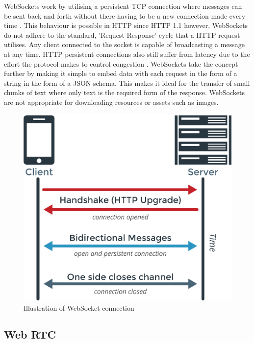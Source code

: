 WebSockets work by utilising a persistent TCP connection where messages can be sent back and forth without there having to be a new connection made every time \cite{wsrfc}. This behaviour is possible in HTTP since HTTP 1.1 however, WebSockets do not adhere to the standard, 'Request-Response' cycle that a HTTP request utilises. Any client connected to the socket is capable of broadcasting a message at any time. HTTP persistent connections also still suffer from latency due to the effort the protocol makes to control congestion \cite{httpvsws}. WebSockets take the concept further by making it simple to embed data with each request in the form of a string in the form of a JSON schema. This makes it ideal for the transfer of small chunks of text where only text is the required form of the response. WebSockets are not appropriate for downloading resources or assets such as images.

\begin{figure}[h!]
    \centering
    \includegraphics[scale=0.3]{res/WebSockets-Diagram.png}
    \caption{Illustration of WebSocket connection \cite{websocket-img}}
    \label{}
\end{figure}

\subsection{Web RTC}

